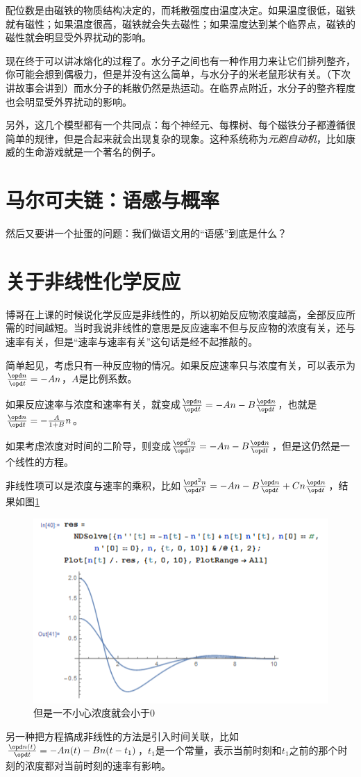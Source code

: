配位数是由磁铁的物质结构决定的，而耗散强度由温度决定。如果温度很低，磁铁就有磁性；如果温度很高，磁铁就会失去磁性；如果温度达到某个临界点，磁铁的磁性就会明显受外界扰动的影响。

现在终于可以讲冰熔化的过程了。水分子之间也有一种作用力来让它们排列整齐，你可能会想到偶极力，但是并没有这么简单，与水分子的米老鼠形状有关。（下次讲故事会讲到）而水分子的耗散仍然是热运动。在临界点附近，水分子的整齐程度也会明显受外界扰动的影响。

另外，这几个模型都有一个共同点：每个神经元、每棵树、每个磁铁分子都遵循很简单的规律，但是合起来就会出现复杂的现象。这种系统称为\emph{元胞自动机}，比如康威的生命游戏就是一个著名的例子。
\section{马尔可夫链：语感与概率}
然后又要讲一个扯蛋的问题：我们做语文用的“语感”到底是什么？
\section{关于非线性化学反应}
博哥在上课的时候说化学反应是非线性的，所以初始反应物浓度越高，全部反应所需的时间越短。当时我说非线性的意思是反应速率不但与反应物的浓度有关，还与速率有关，但是“速率与速率有关”这句话是经不起推敲的。

简单起见，考虑只有一种反应物的情况。如果反应速率只与浓度有关，可以表示为$\frac{\opd n}{\opd t}=-A n$，$A$是比例系数。

如果反应速率与浓度和速率有关，就变成$\frac{\opd n}{\opd t}=-A n-B \frac{\opd n}{\opd t}$，也就是$\frac{\opd n}{\opd t}=-\frac{A}{1+B} n$。

如果考虑浓度对时间的二阶导，则变成$\frac{\opd^2 n}{\opd t^2}=-A n-B \frac{\opd n}{\opd t}$，但是这仍然是一个线性的方程。

非线性项可以是浓度与速率的乘积，比如$\frac{\opd^2 n}{\opd t^2}=-A n-B \frac{\opd n}{\opd t}+C n \frac{\opd n}{\opd t}$，结果如图\ref{fig-nonlinear-reaction}
\begin{figure}[htb]
\centering
\includegraphics[scale=0.5]{fig/nonlinear-reaction.png}
\caption{但是一不小心浓度就会小于0}
\label{fig-nonlinear-reaction}
\end{figure}

另一种把方程搞成非线性的方法是引入时间关联，比如$\frac{\opd n(t)}{\opd t}=-A n(t)-B n(t-t_1)$，$t_1$是一个常量，表示当前时刻和$t_1$之前的那个时刻的浓度都对当前时刻的速率有影响。
